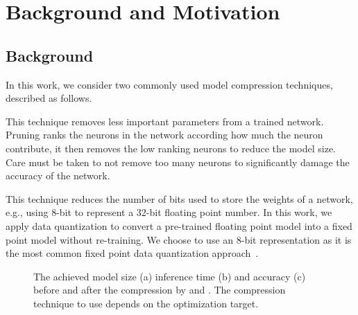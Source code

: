 
\section{Background and Motivation}
\subsection{Background}
In this work, we consider two commonly used model compression techniques, described as follows.

 This technique removes less important parameters from a trained network. Pruning ranks the neurons in the network
according how much the neuron contribute, it then removes the low ranking neurons to reduce the model size. Care must be taken to not
remove too many neurons to significantly damage the accuracy of the network.

 This technique reduces the number of bits used to store the weights of a network, e.g., using 8-bit to
represent a 32-bit floating point number. In this work, we apply data quantization to convert a pre-trained floating point model into a
fixed point model without re-training. We choose to use an 8-bit representation as it is the most common fixed point data quantization
approach~\FIXME{\cite{}}.

\begin{figure}[!t]
\centering
{}
\hfill
{}
\hfill
{}
\caption{The achieved model size (a) inference time (b) and accuracy (c) before and after the compression by \quantization and \pruning.
The compression technique to use depends on the optimization target.}
\label{fig:motivation}
\end{figure}

